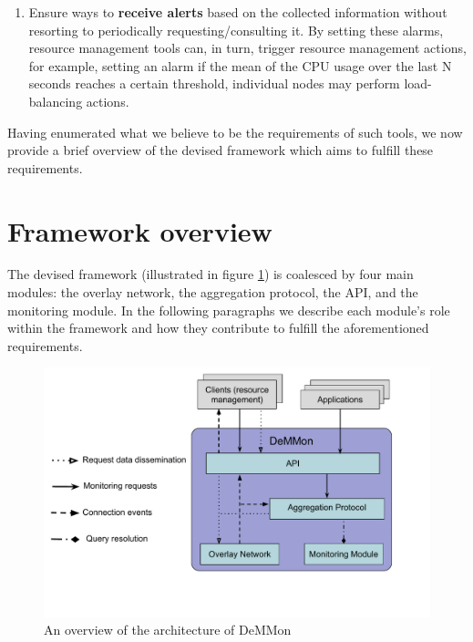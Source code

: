 \begin{enumerate}
    \item Ensure ways to \textbf{receive alerts} based on the collected information without resorting to periodically requesting/consulting it. By setting these alarms, resource management tools can, in turn, trigger resource management actions, for example, setting an alarm if the mean of the CPU usage over the last N seconds reaches a certain threshold, individual nodes may perform load-balancing actions. \label{enum:demmon_6}
    
\end{enumerate}

Having enumerated what we believe to be the requirements of such tools, we now provide a brief overview of the devised framework which aims to fulfill these requirements. 

\section{Framework overview}
\label{sec:framework_overview}


The devised framework (illustrated in figure \ref{fig:demmon-overview}) is coalesced by four main modules: the overlay network, the aggregation protocol, the API, and the monitoring module. In the following paragraphs we describe each module's role within the framework and how they contribute to fulfill the aforementioned requirements.

\begin{figure}[htbp]
    \centering
    \includegraphics[width=\textwidth]{Chapters/Figures/DeMMon-overview.pdf}
    \caption{An overview of the architecture of DeMMon}
    \label{fig:demmon-overview}
\end{figure}
    
